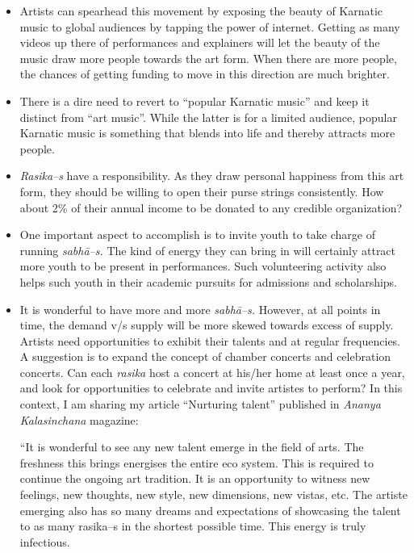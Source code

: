 \begin{itemize}
\itemsep=0pt
\item Artists can spearhead this movement by exposing the beauty of Karnatic music to global audiences by tapping the power of internet. Getting as many videos up there of performances and explainers will let the beauty of the music draw more people towards the art form. When there are more people, the chances of getting funding to move in this direction are much brighter.

 \item There is a dire need to revert to “popular Karnatic music” and keep it distinct from “art music”. While the latter is for a limited audience, popular Karnatic music is something that blends into life and thereby attracts more people.

 \item \textit{Rasika–s} have a responsibility. As they draw personal happiness from this art form, they should be willing to open their purse strings consistently. How about 2\% of their annual income to be donated to any credible organization?

 \item One important aspect to accomplish is to invite youth to take charge of running \textit{sabhā–s.} The kind of energy they can bring in will certainly attract more youth to be present in performances. Such volunteering activity also helps such youth in their academic pursuits for admissions and scholarships.

 \item 
 It is wonderful to have more and more \textit{sabhā–s.} However, at all points in time, the demand v/s supply will be more skewed towards excess of supply. Artists need opportunities to exhibit their talents and at regular frequencies. A suggestion is to expand the concept of chamber concerts and celebration concerts. Can each \textit{rasika} host a concert at his/her home at least once a year, and look for opportunities to celebrate and invite artistes to perform? In this context, I am sharing my article “Nurturing talent” published in \textit{Ananya Kalasinchana} magazine:

\begin{myquote}
“It is wonderful to see any new talent emerge in the field of arts. The freshness this brings energises the entire eco system. This is required to continue the ongoing art tradition. It is an opportunity to witness new feelings, new thoughts, new style, new dimensions, new vistas, etc. The artiste emerging also has so many dreams and expectations of showcasing the talent to as many rasika–s in the shortest possible time. This energy is truly infectious.
\end{myquote}


\end{itemize}
